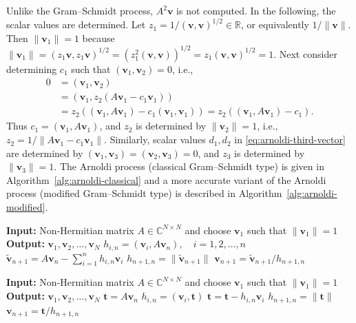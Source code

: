 {Unlike the Gram--Schmidt process, $A^2\bm v$ is not computed. In the following, the scalar values are determined. Let $z_1=1/(\bm v,\bm v)^{1/2}\in\mathbb R$, or equivalently $1/\|\bm v\|$. Then $\|\bm v_1\|=1$ because $\|\bm v_1\|=(z_1\bm v,z_1\bm v)^{1/2}=(z_1^2(\bm v,\bm v))^{1/2}=z_1(\bm v,\bm v)^{1/2}=1$. Next consider determining $c_1$ such that $(\bm v_1,\bm v_2)=0$, i.e.,}
\[
\begin{aligned}
0&=(\bm v_1,\bm v_2)\\
&=(\bm v_1,z_2(A\bm v_1-c_1\bm v_1))\\
&=z_2((\bm v_1,A\bm v_1)-c_1(\bm v_1,\bm v_1))=z_2((\bm v_1,A\bm v_1)-c_1).
\end{aligned}
\]
{Thus $c_1=(\bm v_1,A\bm v_1)$, and $z_2$ is determined by $\|\bm v_2\|=1$, i.e., $z_2=1/\|A\bm v_1-c_1\bm v_1\|$. Similarly, scalar values $d_1,d_2$ in \eqref{eq:arnoldi-third-vector} are determined by $(\bm v_1,\bm v_3)=(\bm v_2,\bm v_3)=0$, and $z_3$ is determined by $\|\bm v_3\|=1$.}
{The Arnoldi process (classical Gram--Schmidt type) is given in Algorithm~\ref{alg:arnoldi-classical} and a more accurate variant of the Arnoldi process (modified Gram--Schmidt type) is described in Algorithm~\ref{alg:arnoldi-modified}.}
\begin{algorithm}[H]\caption{{The Arnoldi process of classical Gram--Schmidt type}}\label{alg:arnoldi-classical}
\begin{algorithmic}[1]
\Statex\textbf{Input:} {Non-Hermitian matrix $A\in\mathbb C^{N\times N}$ and choose $\bm v_1$ such that $\|\bm v_1\|=1$}
\Statex\textbf{Output:} $\bm v_1,\bm v_2,\ldots,\bm v_N$
\State $h_{i,n}=(\bm v_i,A\bm v_n),\quad i=1,2,\ldots,n$
\State $\tilde{\bm v}_{n+1}=A\bm v_n-\sum_{i=1}^n h_{i,n}\bm v_i$
\State $h_{n+1,n}=\|\tilde{\bm v}_{n+1}\|$
\State $\bm v_{n+1}=\tilde{\bm v}_{n+1}/h_{n+1,n}$
\EndFor
\end{algorithmic}\end{algorithm}
\begin{algorithm}[H]\caption{{The Arnoldi process of modified Gram--Schmidt type}}\label{alg:arnoldi-modified}
\begin{algorithmic}[1]
\Statex\textbf{Input:} {Non-Hermitian matrix $A\in\mathbb C^{N\times N}$ and choose $\bm v_1$ such that $\|\bm v_1\|=1$}
\Statex\textbf{Output:} $\bm v_1,\bm v_2,\ldots,\bm v_N$
\State $\bm t=A\bm v_n$
\State $h_{i,n}=(\bm v_i,\bm t)$
\State $\bm t=\bm t-h_{i,n}\bm v_i$
\EndFor
\State $h_{n+1,n}=\|\bm t\|$
\State $\bm v_{n+1}=\bm t/h_{n+1,n}$
\EndFor
\end{algorithmic}\end{algorithm}
